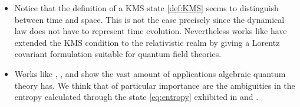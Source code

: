 \begin{itemize}
\item Notice that the definition of a KMS state \ref{def:KMS} seems to distinguish between time and space. This is not the case precisely since the dynamical law does not have to represent time evolution. Nevertheless works like \cite{Bros1994} have extended the KMS condition to the relativistic realm by giving a Lorentz covariant formulation suitable for quantum field theories.

\item Works like  \cite{Reyes2013}, \cite{Balachandran2013c}, and \cite{Balachandran2013} show the vast amount of applications algebraic quantum theory has. We think that of particular importance are the ambiguities in the entropy calculated through the state \ref{eq:entropy} exhibited in \cite{Balachandran2013b} and \cite{Balachandran2013a}.

\end{itemize}
